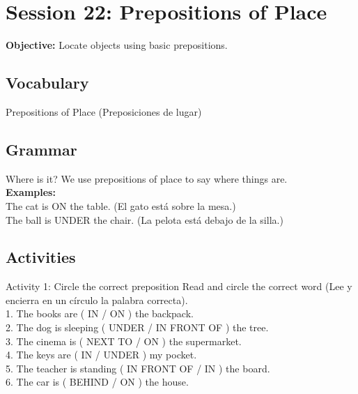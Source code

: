 \section*{Session 22: Prepositions of Place}
\textbf{Objective:} Locate objects using basic prepositions.

\subsection*{Vocabulary}
\begin{vocabcard}{Prepositions of Place (Preposiciones de lugar)}
\end{vocabcard}

\subsection*{Grammar}
\begin{grammartip}{Where is it?}
  We use prepositions of place to say where things are.\\
  \textbf{Examples:}\\
  The cat is ON the table. (El gato está sobre la mesa.)\\
  The ball is UNDER the chair. (La pelota está debajo de la silla.)
\end{grammartip}

\subsection*{Activities}

\begin{activity}{Activity 1: Circle the correct preposition }
  Read and circle the correct word (Lee y encierra en un círculo la palabra correcta).\\
  
  1. The books are ( IN / ON ) the backpack.\\
  2. The dog is sleeping ( UNDER / IN FRONT OF ) the tree.\\
  3. The cinema is ( NEXT TO / ON ) the supermarket.\\
  4. The keys are ( IN / UNDER ) my pocket.\\
  5. The teacher is standing ( IN FRONT OF / IN ) the board.\\
  6. The car is ( BEHIND / ON ) the house.
\end{activity}

